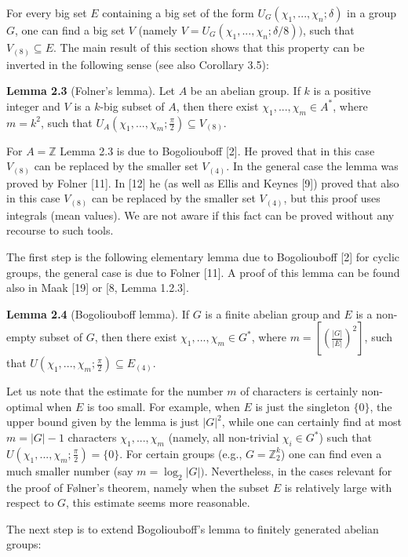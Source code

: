 \documentclass[12pt]{article}
\begin{document}
        For every big set $E$ containing a big set of the form $U_G (\chi_1,...,\chi_n; \delta)$ in a group $G$, one can find a big set $V$ (namely
    $V = U_G (\chi_1,...,\chi_n; \delta/8))$, such that $V_{(8)} \subseteq E$. The main result of this section shows that this property can be inverted in
    the following sense (see also Corollary 3.5):


    \textbf{Lemma 2.3} (Folner's lemma). Let $A$ be an abelian group. If $k$ is a positive integer and $V$ is a $k$-big subset of $A$, then there exist
    $\chi_1,...,\chi_m \in A^*$, where $m = k^2$, such that $U_A (\chi_1,...,\chi_m; \frac{\pi}{2}) \subseteq V_{(8)}$.
    
    
        For $A = \mathbb{Z}$ Lemma 2.3 is due to Bogoliouboff [2]. He proved that in this case $V_{(8)}$ can be replaced by the smaller set $V_{(4)}$.
    In the general case the lemma was proved by Folner [11]. In [12] he (as well as Ellis and Keynes [9]) proved that also in
    this case $V_{(8)}$ can be replaced by the smaller set $V_{(4)}$, but this proof uses integrals (mean values). We are not aware if this
    fact can be proved without any recourse to such tools.
    
    
        The first step is the following elementary lemma due to Bogoliouboff [2] for cyclic groups, the general case is due to
    Folner [11]. A proof of this lemma can be found also in Maak [19] or [8, Lemma 1.2.3].


    \textbf{Lemma 2.4} (Bogoliouboff lemma). If $G$ is a finite abelian group and $E$ is a non-empty subset of $G$, then there exist $\chi_1,...,\chi_m \in G^*$,
    where $m = [{(\frac{|G|}{|E|})}^2]$, such that $U(\chi_1,...,\chi_m; \frac{\pi}{2} ) \subseteq E_{(4)}$.
    
    
        Let us note that the estimate for the number $m$ of characters is certainly non-optimal when $E$ is too small. For example,
    when $E$ is just the singleton $\{0\}$, the upper bound given by the lemma is just $|G|^2$, while one can certainly find at most
    $m = |G| - 1$ characters $\chi_1,...,\chi_m$ (namely, all non-trivial $\chi_i \in G^*$) such that $U(\chi_1,...,\chi_m; \frac{\pi}{2} ) = \{0\}$. For certain groups
    (e.g., $G = \mathbb{Z}^k_2$) one can find even a much smaller number (say $m = \log_2 |G|)$. Nevertheless, in the cases relevant for the proof
    of Følner's theorem, namely when the subset $E$ is relatively large with respect to $G$, this estimate seems more reasonable.
    
    
        The next step is to extend Bogoliouboff's lemma to finitely generated abelian groups:
\end{document}
